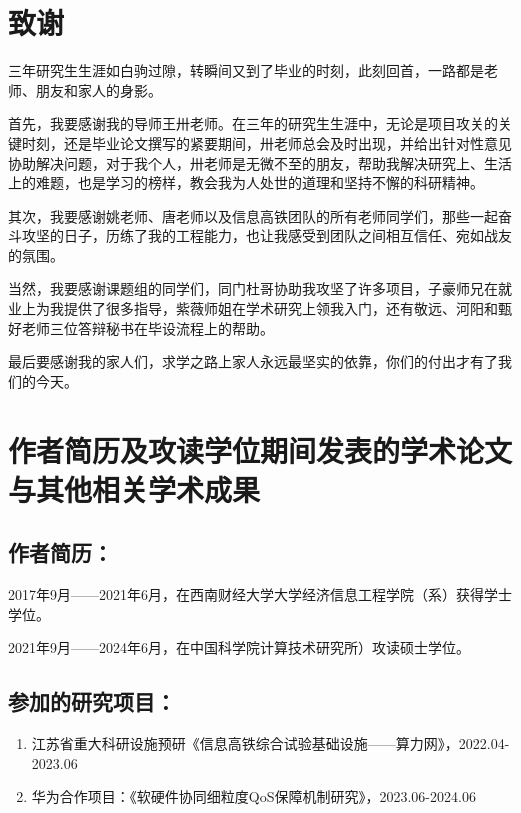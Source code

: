 \chapter[致谢]{致\quad 谢}%

三年研究生生涯如白驹过隙，转瞬间又到了毕业的时刻，此刻回首，一路都是老师、朋友和家人的身影。

首先，我要感谢我的导师王卅老师。在三年的研究生生涯中，无论是项目攻关的关键时刻，还是毕业论文撰写的紧要期间，卅老师总会及时出现，并给出针对性意见协助解决问题，对于我个人，卅老师是无微不至的朋友，帮助我解决研究上、生活上的难题，也是学习的榜样，教会我为人处世的道理和坚持不懈的科研精神。

其次，我要感谢姚老师、唐老师以及信息高铁团队的所有老师同学们，那些一起奋斗攻坚的日子，历练了我的工程能力，也让我感受到团队之间相互信任、宛如战友的氛围。

当然，我要感谢课题组的同学们，同门杜哥协助我攻坚了许多项目，子豪师兄在就业上为我提供了很多指导，紫薇师姐在学术研究上领我入门，还有敬远、河阳和甄好老师三位答辩秘书在毕设流程上的帮助。

最后要感谢我的家人们，求学之路上家人永远最坚实的依靠，你们的付出才有了我们的今天。


\chapter{作者简历及攻读学位期间发表的学术论文与其他相关学术成果}

\section*{作者简历：}

2017年9月——2021年6月，在西南财经大学大学经济信息工程学院（系）获得学士学位。

2021年9月——2024年6月，在中国科学院计算技术研究所）攻读硕士学位。

\section*{参加的研究项目：}

\begin{enumerate}
    \item 江苏省重大科研设施预研《信息高铁综合试验基础设施——算力网》，2022.04-2023.06
    \item 华为合作项目：《软硬件协同细粒度QoS保障机制研究》，2023.06-2024.06
\end{enumerate}


\cleardoublepage[plain]%
